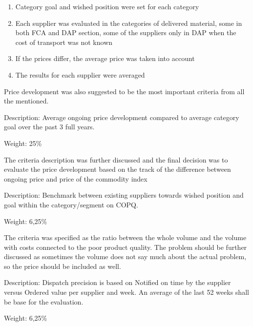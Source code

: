 \documentclass[oneside,12pt]{article}%
\begin{document}
\begin{enumerate}
  \item Category goal and wished position were set for each category
  \item Each supplier was evaluated in the categories of delivered material, some in both FCA and DAP section, some of the suppliers only in DAP when the cost of transport was not known
  \item If the prices differ, the average price was taken into account
  \item The results for each supplier were averaged
\end{enumerate}

Price development was also suggested to be the most important criteria from all the mentioned.


Description: Average ongoing price development compared to average category goal over the past 3 full years. \par

\vspace{2mm}
\noindent Weight: 25\%
\vspace{2mm}

The criteria description was further discussed and the final decision was to evaluate the price development based on the track of the difference between ongoing price and price of the commodity index


Description: Benchmark between existing suppliers towards wished position and goal within the category/segment on COPQ.

\vspace{2mm}
\noindent Weight: 6,25\%
\vspace{2mm}

The criteria was specified as the ratio between the whole volume and the volume with costs connected to the poor product quality. The problem should be further discussed as sometimes the volume does not say much about the actual problem, so the price should be included as well.


Description: Dispatch precision is based on Notified on time by the supplier versus Ordered value per supplier and week. An average of the last 52 weeks shall be base for the evaluation. \par

\vspace{2mm}
\noindent Weight: 6,25\%
\vspace{2mm} \par
\end{document}
